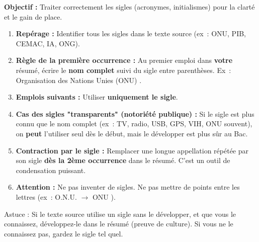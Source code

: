 \documentclass[11pt]{article}
\newcommand{\cle}[1]{{\popxbold\color{popdark}#1}}
\begin{document}
\begin{methode}
\textbf{Objectif :} Traiter correctement les sigles (acronymes, initialismes) pour la clarté et le gain de place.
\begin{enumerate}
    \item \textbf{Repérage :} Identifier tous les sigles dans le texte source (ex~: \cle{ONU}, \cle{PIB}, \cle{CEMAC}, \cle{IA}, \cle{ONG}).
    \item \textbf{Règle de la première occurrence :} Au premier emploi dans \textbf{votre} résumé, écrire le \textbf{nom complet} suivi du sigle entre parenthèses. Ex~: \og Organisation des Nations Unies (ONU) \fg{}.
    \item \textbf{Emplois suivants :} Utiliser \textbf{uniquement le sigle}.
    \item \textbf{Cas des sigles "transparents" (notoriété publique) :} Si le sigle est plus connu que le nom complet (ex~: \cle{TV}, \cle{radio}, \cle{USB}, \cle{GPS}, \cle{VIH}, \cle{ONU} souvent), on \textbf{peut} l'utiliser seul dès le début, mais le développer est plus sûr au Bac.
    \item \textbf{Contraction par le sigle :} Remplacer une longue appellation répétée par son sigle \textbf{dès la 2ème occurrence} dans le résumé. C'est un outil de condensation puissant.
    \item \textbf{Attention :} Ne pas inventer de sigles. Ne pas mettre de points entre les lettres (ex~: \og O.N.U. \fg{} $\rightarrow$ \og ONU \fg{}).
\end{enumerate}
\cle{Astuce} : Si le texte source utilise un sigle sans le développer, et que vous le connaissez, développez-le dans le résumé (preuve de culture). Si vous ne le connaissez pas, gardez le sigle tel quel.
\end{methode}
\end{document}
